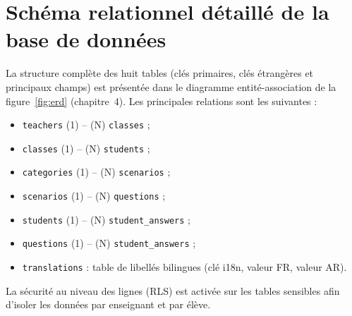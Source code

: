\documentclass[12pt, a4paper, oneside]{report}
\begin{document}
\chapter{Schéma relationnel détaillé de la base de données}
La structure complète des huit tables (clés primaires, clés étrangères et principaux champs) est présentée dans le diagramme entité-association de la figure~\ref{fig:erd} (chapitre~4). Les principales relations sont les suivantes :
\begin{itemize}[leftmargin=*]
  \item \texttt{teachers} (1) -- (N) \texttt{classes} ;
  \item \texttt{classes} (1) -- (N) \texttt{students} ;
  \item \texttt{categories} (1) -- (N) \texttt{scenarios} ;
  \item \texttt{scenarios} (1) -- (N) \texttt{questions} ;
  \item \texttt{students} (1) -- (N) \texttt{student\_answers} ;
  \item \texttt{questions} (1) -- (N) \texttt{student\_answers} ;
  \item \texttt{translations} : table de libellés bilingues (clé i18n, valeur FR, valeur AR).
\end{itemize}
La sécurité au niveau des lignes (RLS) est activée sur les tables sensibles afin d'isoler les données par enseignant et par élève.
\end{document}
